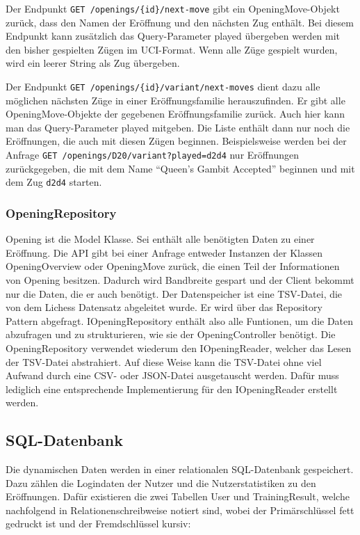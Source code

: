 Der Endpunkt \lstinline|GET /openings/{id}/next-move| gibt ein OpeningMove-Objekt zurück, dass den Namen der Eröffnung und den nächsten Zug enthält. Bei diesem Endpunkt kann zusätzlich das Query-Parameter played übergeben werden mit den bisher gespielten Zügen im \ac{UCI}-Format. Wenn alle Züge gespielt wurden, wird ein leerer String als Zug übergeben.

Der Endpunkt \lstinline|GET /openings/{id}/variant/next-moves| dient dazu alle möglichen nächsten Züge in einer Eröffnungsfamilie herauszufinden. Er gibt alle OpeningMove-Objekte der gegebenen Eröffnungsfamilie zurück. Auch hier kann man das Query-Parameter played mitgeben. Die Liste enthält dann nur noch die Eröffnungen, die auch mit diesen Zügen beginnen. Beispielsweise werden bei der Anfrage \lstinline|GET /openings/D20/variant?played=d2d4| nur Eröffnungen zurückgegeben, die mit dem Name \enquote{Queen's Gambit Accepted} beginnen und mit dem Zug \lstinline|d2d4| starten.


\subsubsection{OpeningRepository}
Opening ist die Model Klasse. Sei enthält alle benötigten Daten zu einer Eröffnung. Die API gibt bei einer Anfrage entweder Instanzen der Klassen OpeningOverview oder OpeningMove zurück, die einen Teil der Informationen von Opening besitzen. Dadurch wird Bandbreite gespart und der Client bekommt nur die Daten, die er auch benötigt. Der Datenspeicher ist eine TSV-Datei, die von dem Lichess Datensatz abgeleitet wurde. %
Er wird über das Repository Pattern abgefragt. IOpeningRepository enthält also alle Funtionen, um die Daten abzufragen und zu strukturieren, wie sie der OpeningController benötigt. Die OpeningRepository verwendet wiederum den IOpeningReader, welcher das Lesen der TSV-Datei abstrahiert. Auf diese Weise kann die TSV-Datei ohne viel Aufwand durch eine CSV- oder JSON-Datei ausgetauscht werden. Dafür muss lediglich eine entsprechende Implementierung für den IOpeningReader erstellt werden.

\subsection{SQL-Datenbank}
Die dynamischen Daten werden in einer relationalen SQL-Datenbank gespeichert. Dazu zählen die Logindaten der Nutzer und die Nutzerstatistiken zu den Eröffnungen. Dafür existieren die zwei Tabellen User und TrainingResult, welche nachfolgend in Relationenschreibweise notiert sind, wobei der Primärschlüssel fett gedruckt ist und der Fremdschlüssel kursiv:

